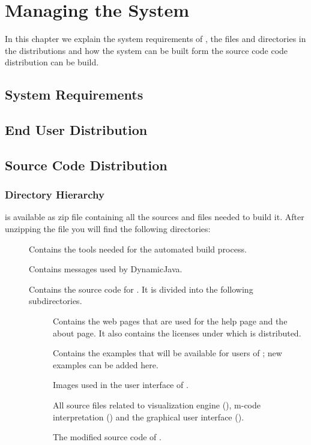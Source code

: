 \section{Managing the \jel{} System}
\label{sec:Managing_Jeliot_3_System}

In this chapter we explain the system requirements of \jel{}, the
files and directories in the distributions and how the system can
be built form the source code code distribution can be build.

\subsection{System Requirements}
\label{sec:System_Requirements}

\subsection{End User Distribution}
\label{sec:End_User_Distribution}

\subsection{Source Code Distribution}
\label{sec:Source_Code_Distribution}

\subsubsection{Directory Hierarchy}

\jel{} is available as zip file containing all the sources
and files needed to build it. After unzipping the file you will
find the following directories:

\begin{description}
\item[] Contains the tools needed for the automated build process.
\item[] Contains messages used by DynamicJava.
\item[] Contains the source code for \jel{}. It is divided into
the following subdirectories.
\begin{description}
\item[] Contains the web pages that are used for the help page
and the about page. It also contains the licenses under which
\jel{} is distributed.
\item[] Contains the examples that will be available for users
of \jel{}; new examples can be added here.
\item[] Images used in the user interface of \jel{}.
\item[] All source files related to \jel{} visualization engine (),
m-code interpretation () and the graphical user interface ().
\item[] The modified source code of \djava{}.
\end{description}
\end{description}

